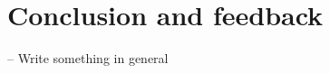 \documentclass[a4paper,12pt]{article}
\begin{document}

\section{Conclusion and feedback}

-- Write something in general

\end{document}
